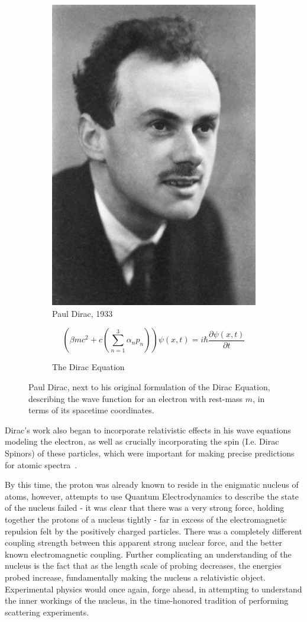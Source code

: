 \begin{figure}[ht]
	\centering
	\begin{subfigure}{.4\textwidth}
		\centering
		\includegraphics[width=0.4\linewidth]{../Chapter2/fig/pauldirac.jpg}
		\caption{Paul Dirac, 1933 ~\cite{NobelFoundation1933}}
		\label{fig:pauldirac}
	\end{subfigure}%
	\begin{subfigure}{0.6\textwidth}
		\centering
		\begin{equation}
			\left(\beta mc^2 + c\left(\sum_{n \mathop =1}^{3}\alpha_n p_n\right)\right) \psi (x,t) = i \hbar \frac{\partial\psi(x,t) }{\partial t}
		\end{equation}
		\caption{The Dirac Equation}
		\label{eq:diracquation}
	\end{subfigure}
	\caption{ 
		Paul Dirac, next to his original formulation of the Dirac Equation,
		describing the wave function for an electron with rest-mass $m$, in terms of
		its spacetime coordinates.
	}
	\label{fig:thomsonrays}
\end{figure}

Dirac's work also began to incorporate relativistic effects in his wave
equations modeling the electron, as well as crucially incorporating the spin
(I.e. Dirac Spinors) of these particles, which were important for making precise
predictions for atomic spectra~\needcite{}.

By this time, the proton was already known to reside in the enigmatic nucleus of
atoms, however, attempts to use Quantum Electrodynamics to describe the state of
the nucleus failed - it was clear that there was a very strong force, holding
together the protons of a nucleus tightly - far in excess of the electromagnetic
repulsion felt by the positively charged particles. There was a completely
different coupling strength between this apparent strong nuclear force, and the
better known electromagnetic coupling. Further complicating an understanding of
the nucleus is the fact that as the length scale of probing decreases, the
energies probed increase, fundamentally making the nucleus a relativistic
object. Experimental physics would once again, forge ahead, in attempting to
understand the inner workings of the nucleus, in the time-honored tradition of
performing scattering experiments.

